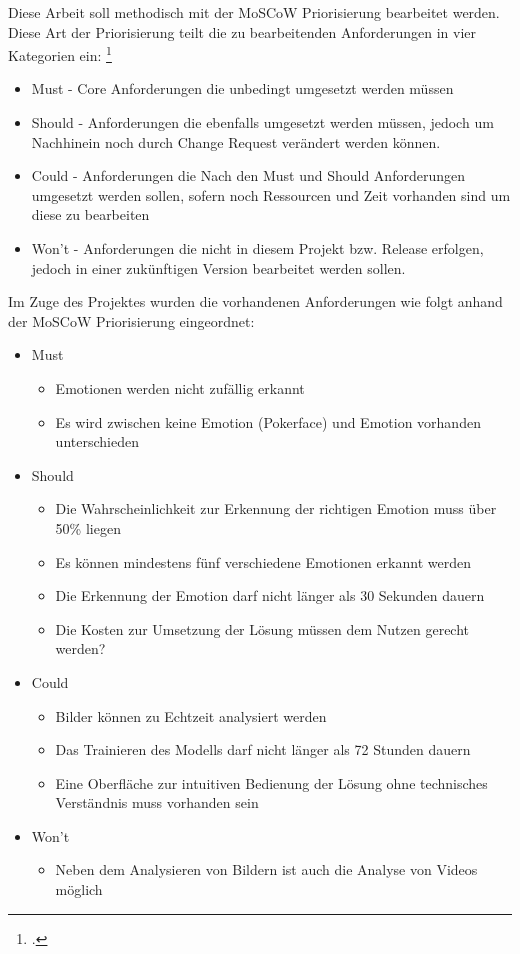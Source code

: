 \documentclass[12pt, a4paper]{scrbook}
\begin{document}
Diese Arbeit soll methodisch mit der MoSCoW Priorisierung bearbeitet werden. Diese Art der Priorisierung teilt die zu bearbeitenden Anforderungen in vier Kategorien ein:
\footcite[vgl.][90]{Projektmanagement}
\begin{itemize}
\item Must - Core Anforderungen die unbedingt umgesetzt werden müssen
\item Should - Anforderungen die ebenfalls umgesetzt werden müssen, jedoch um Nachhinein noch durch Change Request verändert werden können.
\item Could - Anforderungen die Nach den Must und Should Anforderungen umgesetzt werden sollen, sofern noch Ressourcen und Zeit vorhanden sind um diese zu bearbeiten
\item Won't - Anforderungen die nicht in diesem Projekt bzw. Release erfolgen, jedoch in einer zukünftigen Version bearbeitet werden sollen. 
\end{itemize}
Im Zuge des Projektes wurden die vorhandenen Anforderungen wie folgt anhand der MoSCoW Priorisierung eingeordnet:
\begin{itemize}
\item Must
\begin{itemize}
\item Emotionen werden nicht zufällig erkannt
\item Es wird zwischen keine Emotion (Pokerface) und Emotion vorhanden unterschieden
\end{itemize}
\item Should
\begin{itemize}
\item Die Wahrscheinlichkeit zur Erkennung der richtigen Emotion muss über 50\% liegen
\item Es können mindestens fünf verschiedene Emotionen erkannt werden
\item Die Erkennung der Emotion darf nicht länger als 30 Sekunden dauern
\item Die Kosten zur Umsetzung der Lösung müssen dem Nutzen gerecht werden?
\end{itemize}
\item Could
\begin{itemize}
\item Bilder können zu Echtzeit analysiert werden
\item Das Trainieren des Modells darf nicht länger als 72 Stunden dauern
\item Eine Oberfläche zur intuitiven Bedienung der Lösung ohne technisches Verständnis muss vorhanden sein
\end{itemize}
\item Won't
\begin{itemize}
\item Neben dem Analysieren von Bildern ist auch die Analyse von Videos möglich
\end{itemize}
\end{itemize}
\end{document}
